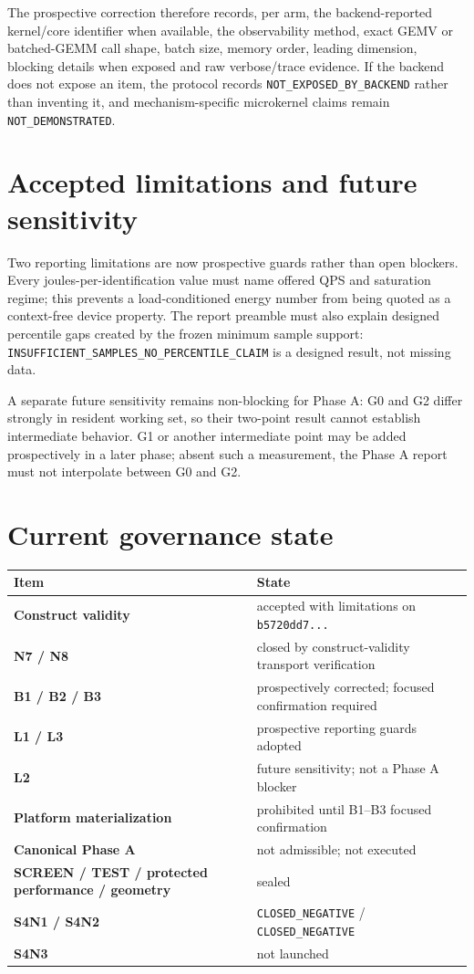 \documentclass[10pt,a4paper]{article}
\newcommand{\code}[1]{\texttt{#1}}
\begin{document}
The prospective correction therefore records, per arm, the backend-reported kernel/core identifier when available, the
observability method, exact GEMV or batched-GEMM call shape, batch size, memory order, leading dimension, blocking details
when exposed and raw verbose/trace evidence. If the backend does not expose an item, the protocol records
\code{NOT\_EXPOSED\_BY\_BACKEND} rather than inventing it, and mechanism-specific microkernel claims remain
\code{NOT\_DEMONSTRATED}.

\section{Accepted limitations and future sensitivity}

Two reporting limitations are now prospective guards rather than open blockers. Every joules-per-identification value must
name offered QPS and saturation regime; this prevents a load-conditioned energy number from being quoted as a context-free
device property. The report preamble must also explain designed percentile gaps created by the frozen minimum sample
support: \code{INSUFFICIENT\_SAMPLES\_NO\_PERCENTILE\_CLAIM} is a designed result, not missing data.

A separate future sensitivity remains non-blocking for Phase A: G0 and G2 differ strongly in resident working set, so their
two-point result cannot establish intermediate behavior. G1 or another intermediate point may be added prospectively in a
later phase; absent such a measurement, the Phase A report must not interpolate between G0 and G2.

\section{Current governance state}

\begin{tabularx}{\linewidth}{>{\bfseries}l X}
\toprule
Item & State \\
\midrule
Construct validity & accepted with limitations on \code{b5720dd7...} \\
N7 / N8 & closed by construct-validity transport verification \\
B1 / B2 / B3 & prospectively corrected; focused confirmation required \\
L1 / L3 & prospective reporting guards adopted \\
L2 & future sensitivity; not a Phase A blocker \\
Platform materialization & prohibited until B1--B3 focused confirmation \\
Canonical Phase A & not admissible; not executed \\
SCREEN / TEST / protected performance / geometry & sealed \\
S4N1 / S4N2 & \code{CLOSED\_NEGATIVE} / \code{CLOSED\_NEGATIVE} \\
S4N3 & not launched \\
\bottomrule
\end{tabularx}
\end{document}
